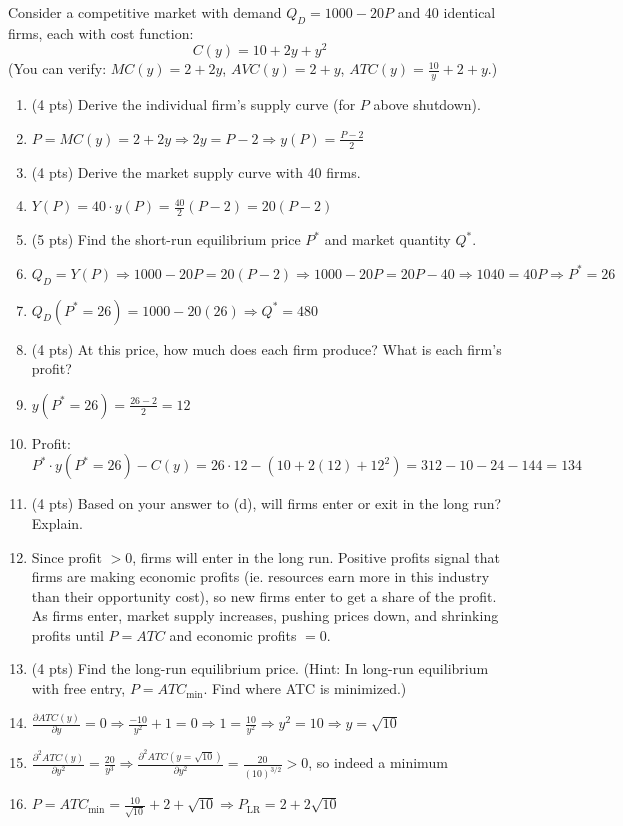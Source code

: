 \documentclass[11pt]{article}
\begin{document}
Consider a competitive market with demand $Q_D = 1000 - 20P$ and 40 identical firms, each with cost function:
\[
C(y) = 10 + 2y + y^2
\]
(You can verify: $MC(y) = 2 + 2y$, $AVC(y) = 2 + y$, $ATC(y) = \frac{10}{y} + 2 + y$.)

\begin{enumerate}[label=(\alph*)]
    \item (4 pts) Derive the individual firm's supply curve (for $P$ above shutdown).
    \item[] $P=MC(y)=2+2y\Rightarrow 2y=P-2\Rightarrow y(P)=\frac{P-2}{2}$
    
    \item (4 pts) Derive the market supply curve with 40 firms.
    \item[] $Y(P)=40\cdot y(P)=\frac{40}{2}(P-2)=20(P-2)$
    
    \item (5 pts) Find the short-run equilibrium price $P^*$ and market quantity $Q^*$.
    \item[] $Q_D=Y(P)\Rightarrow 1000-20P=20(P-2)\Rightarrow1000-20P=20P-40\Rightarrow1040=40P\Rightarrow P^*=26$
    \item[] $Q_D(P^*=26)=1000-20(26)\Rightarrow Q^*=480$
    
    \item (4 pts) At this price, how much does each firm produce? What is each firm's profit?
    \item[] $y(P^*=26)=\frac{26-2}{2}=12$
    \item[] Profit: $P^*\cdot y(P^*=26)-C(y)=26\cdot12-(10+2(12)+12^2)=312-10-24-144=134$
    
    \item (4 pts) Based on your answer to (d), will firms enter or exit in the long run? Explain.
    \item[] Since profit $>0$, firms will enter in the long run.  Positive profits signal that firms are making economic profits (ie. resources earn more in this industry than their opportunity cost), so new firms enter to get a share of the profit. As firms enter, market supply increases, pushing prices down, and shrinking profits until $P=ATC$ and economic profits $=0$. 
    
    \item (4 pts) Find the long-run equilibrium price. (Hint: In long-run equilibrium with free entry, $P = ATC_{\min}$. Find where ATC is minimized.)
    \item[] $\frac{\partial ATC(y)}{\partial y}=0\Rightarrow\frac{-10}{y^2}+1=0\Rightarrow1=\frac{10}{y^2}\Rightarrow y^2=10\Rightarrow y=\sqrt{10}$
    \item[] $\frac{\partial^2ATC(y)}{\partial y^2}=\frac{20}{y^3}\Rightarrow\frac{\partial^2ATC(y=\sqrt{10})}{\partial y^2}=\frac{20}{(10)^{3/2}}>0$, so indeed a minimum
    \item[] $P=ATC_{\text{min}}=\frac{10}{\sqrt{10}}+2+\sqrt{10}\Rightarrow P_{\text{LR}}=2+2\sqrt{10}$
\end{enumerate}
\end{document}
